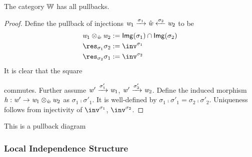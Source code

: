 \begin{lemma}
    The category $\mathbb{W}$ has all pullbacks.
\end{lemma}
\begin{proof}
    Define the pullback of injections $\mathit{w}_1 \xrightarrow{\sigma_1} \hat{\mathit{w}} \xleftarrow{\sigma_2} \mathit{w}_2$ to be
    \begin{align*} 
        \vw_1 \pltimes{\hat\vw} \vw_2 & \eqdef \img{\sigma_1} \setInt \img{\sigma_2} \\
        \res_{\sigma_1}\sigma_2 & \eqdef \inv^{\sigma_1} \\
        \res_{\sigma_2}\sigma_1 & \eqdef \inv^{\sigma_2}
    \end{align*}
    It is clear that the square 
        commutes.
    Further assume $\mathit{w}' \xrightarrow{\sigma'_1} \mathit{w}_1$, $\mathit{w}' \xrightarrow{\sigma'_2} \mathit{w}_2$.
    Define the induced morphism $\mathit{h} : \mathit{w}' \to \mathit{w}_1 \otimes_{\hat{\mathit{w}}} \mathit{w}_2$ as $\sigma_1 \comp \sigma'_1$. 
    It is well-defined by $\sigma_1 \comp \sigma'_1 = \sigma_2 \comp \sigma'_2$.
    Uniqueness follows from injectivity of $\inv^{\sigma_1}$, $\inv^{\sigma_2}$.
\end{proof}

\begin{example}
    This is a pullback diagram 
\end{example}

\subsubsection{Local Independence Structure}

